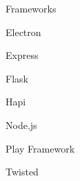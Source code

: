 \begin{skillset}{Frameworks}
  \item Electron
  \item Express
  \item Flask
  \item Hapi
  \item Node.js
  \item Play Framework
  \item Twisted
\end{skillset}
